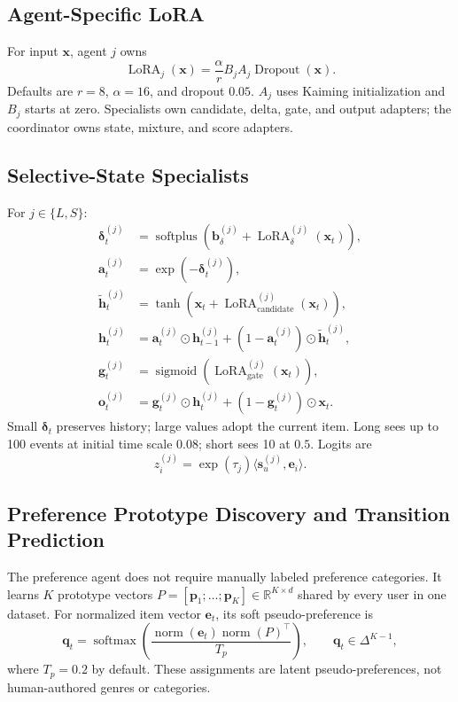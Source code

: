 \documentclass[11pt,a4paper]{article}
\newcommand{\R}{\mathbb{R}}
\newcommand{\softmax}{\operatorname{softmax}}
\newcommand{\sigmoid}{\operatorname{sigmoid}}
\begin{document}
\subsection{Agent-Specific LoRA}

For input $\bm x$, agent $j$ owns
\begin{equation}
  \operatorname{LoRA}_j(\bm x)
  =
  \frac{\alpha}{r}B_jA_j\operatorname{Dropout}(\bm x).
\end{equation}
Defaults are $r=8$, $\alpha=16$, and dropout $0.05$. $A_j$ uses Kaiming initialization and $B_j$ starts at zero. Specialists own candidate, delta, gate, and output adapters; the coordinator owns state, mixture, and score adapters.

\subsection{Selective-State Specialists}

For $j\in\{L,S\}$:
\begin{align}
  \bm\delta_t^{(j)}
  &=
  \operatorname{softplus}
  \left(\bm b_\delta^{(j)}+\operatorname{LoRA}^{(j)}_\delta(\bm x_t)\right),\\
  \bm a_t^{(j)}&=\exp(-\bm\delta_t^{(j)}),\\
  \widetilde{\bm h}_t^{(j)}
  &=
  \tanh\left(\bm x_t+\operatorname{LoRA}^{(j)}_{\mathrm{candidate}}(\bm x_t)\right),\\
  \bm h_t^{(j)}
  &=
  \bm a_t^{(j)}\odot\bm h_{t-1}^{(j)}
  +(1-\bm a_t^{(j)})\odot\widetilde{\bm h}_t^{(j)},\\
  \bm g_t^{(j)}
  &=
  \sigmoid\left(\operatorname{LoRA}^{(j)}_{\mathrm{gate}}(\bm x_t)\right),\\
  \bm o_t^{(j)}
  &=
  \bm g_t^{(j)}\odot\bm h_t^{(j)}
  +(1-\bm g_t^{(j)})\odot\bm x_t.
\end{align}
Small $\bm\delta_t$ preserves history; large values adopt the current item. Long sees up to 100 events at initial time scale $0.08$; short sees 10 at $0.5$. Logits are
\begin{equation}
  z_i^{(j)}=\exp(\tau_j)\langle\bm s_u^{(j)},\bm e_i\rangle.
\end{equation}

\subsection{Preference Prototype Discovery and Transition Prediction}
\label{sec:preference-agent}

The preference agent does not require manually labeled preference categories.
It learns $K$ prototype vectors
$P=[\bm p_1;\ldots;\bm p_K]\in\R^{K\times d}$ shared by every user in one
dataset. For normalized item vector $\bm e_t$, its soft pseudo-preference is
\begin{equation}
  \bm q_t
  =
  \softmax\!\left(
    \frac{\operatorname{norm}(\bm e_t)
    \operatorname{norm}(P)^\top}{T_p}
  \right),
  \qquad \bm q_t\in\Delta^{K-1},
\end{equation}
where $T_p=0.2$ by default. These assignments are latent pseudo-preferences,
not human-authored genres or categories.
\end{document}
